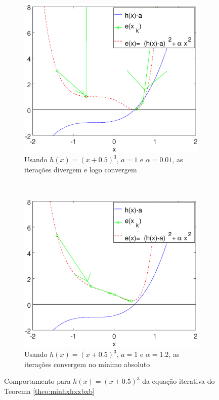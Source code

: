 \begin{figure}[!h]
    \centering
    \begin{subfigure}[b]{0.45\textwidth}
        \includegraphics[width=\textwidth]{chapters/minimization/mfiles/hx3_a_alphax/minimizando_hx_a_alphax_1.eps}
        \caption{Usando $h(x)=(x+0.5)^3$, $a=1$ e $\alpha=0.01$, as iterações divergem e logo convergem}
        \label{fig:hx3bcasesa}
    \end{subfigure}
    ~ %
    \begin{subfigure}[b]{0.45\textwidth}
        \includegraphics[width=\textwidth]{chapters/minimization/mfiles/hx3_a_alphax/minimizando_hx_a_alphax_2.eps}
        \caption{Usando $h(x)=(x+0.5)^3$, $a=1$ e $\alpha=1.2$, as iterações convergem no mínimo absoluto}
        \label{fig:hx3bcasesb}
    \end{subfigure}
    \caption{Comportamento para $h(x)=(x+0.5)^3$ da equação iterativa do Teorema \ref{theo:minhxhxxbxb}}
    \label{fig:hx3bcases}
\end{figure}
